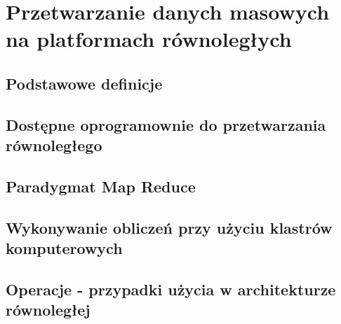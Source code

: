 \chapter{Przetwarzanie danych masowych na platformach równoległych} \label{chap.big-data-processing}

\section{Podstawowe definicje}
\section{Dostępne oprogramownie do przetwarzania równoległego}
\section{Paradygmat Map Reduce}
\section{Wykonywanie obliczeń przy użyciu klastrów komputerowych}
\section{Operacje - przypadki użycia w architekturze równoległej}
